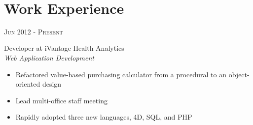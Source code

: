 \documentclass[10pt]{article} %
\begin{document}
\color{text1} %


\par{\\ %
	

\begin{minipage}[t]{0.5\textwidth}
\vspace{0pt} %
	

\section{Work Experience} 


{\raggedleft\textsc{Jun 2012 - Present}\par}

{\raggedright\large Developer at iVantage Health Analytics\\
\textit{Web Application Development}\\[5pt]}
\begin{itemize}
  \item Refactored value-based purchasing calculator from a procedural to an object-oriented design
  \item Lead multi-office staff meeting
  \item Rapidly adopted three new languages, 4D, SQL, and PHP
\end{itemize}



\end{minipage}}
\end{document}

